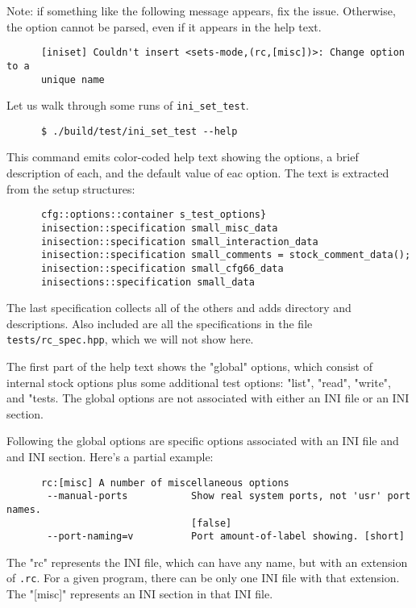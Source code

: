    Note: if something like the following message appears, fix the issue.
   Otherwise, the option cannot be parsed, even if it appears in the
   help text.

   \begin{verbatim}
      [iniset] Couldn't insert <sets-mode,(rc,[misc])>: Change option to a
      unique name
   \end{verbatim}

   Let us walk through some runs of
   \texttt{ini\_set\_test}.

   \begin{verbatim}
      $ ./build/test/ini_set_test --help
   \end{verbatim}

   This command emits color-coded help text showing the options, a brief
   description of each, and the default value of eac option.
   The text is extracted from the setup structures:

   \begin{verbatim}
      cfg::options::container s_test_options} 
      inisection::specification small_misc_data
      inisection::specification small_interaction_data
      inisection::specification small_comments = stock_comment_data();
      inisection::specification small_cfg66_data
      inisections::specification small_data
   \end{verbatim}

   The last specification collects all of the others and adds directory and
   descriptions.  Also included are all the specifications in the
   file \texttt{tests/rc\_spec.hpp}, which we will not show here.

   The first part of the help text shows the "global" options, which consist
   of internal stock options plus some additional test options:
   "list", "read", "write", and "tests.
   The global options are not associated with either an INI file
   or an INI section.

   Following the global options are specific options associated with an
   INI file and and INI section.  Here's a partial example:

   \begin{verbatim}
      rc:[misc] A number of miscellaneous options
       --manual-ports           Show real system ports, not 'usr' port names.
                                [false]
       --port-naming=v          Port amount-of-label showing. [short]
   \end{verbatim}

   The "rc" represents the INI file, which can have any name, but with an
   extension of \texttt{.rc}.
   For a given program, there can be only one INI file with that extension.
   The "[misc]" represents an INI section in that INI file.

